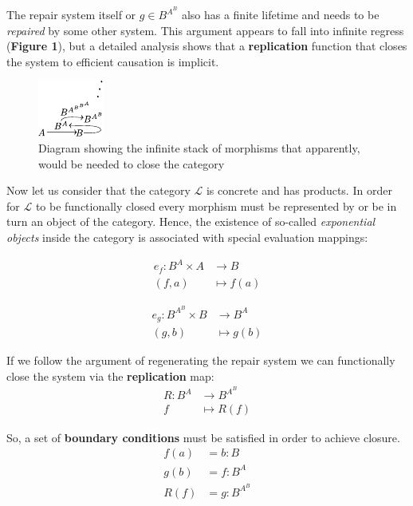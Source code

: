 \documentclass[aps,twocolumn]{revtex4-1}
\begin{document}
 The repair system itself or $g \in B^{A^B}$ also has a finite lifetime and needs to be {\it repaired} by some other system. 
This argument appears to fall into infinite regress (\textbf{Figure 1}), but a detailed analysis shows that a \textbf{replication} function that closes the system to efficient causation is implicit.

\begin{figure}
\noindent\includegraphics[width=0.45\columnwidth]{fig/mrcatinf.pdf}
\caption{Diagram showing the infinite stack of morphisms that apparently, would be needed to close the category}
\label{fig:hom}
\end{figure}

Now let us consider that the category $\mathcal{L}$ is concrete and has products. In order for  $\mathcal{L}$  to be functionally closed every morphism must be represented by or be in turn an object of the category. Hence, the existence of so-called {\it exponential objects} inside the category is associated with special evaluation mappings:

\begin{align*}
e_f : B^A \times A &\longrightarrow B\\
(f,a) & \longmapsto f(a)
\end{align*}
		
\begin{align*}
			e_g: B^{A^B} \times B &\longrightarrow B^A\\
	    			            (g,b) & \longmapsto    g(b)
			\end{align*}		

If we follow the argument of regenerating the repair system we can functionally close the system via the \textbf{replication} map:
\begin{align*}
R: B^A & \longrightarrow B^{A^B}\\
f & \longmapsto R(f)
\end{align*}	

So, a set of \textbf{boundary conditions} must be satisfied in order to achieve closure.
			\begin{align*}
			f(a) &= b : B\\
			g(b) &= f : B^A\\
			R(f) &= g : B^{A^B}
			\end{align*}
\end{document}
